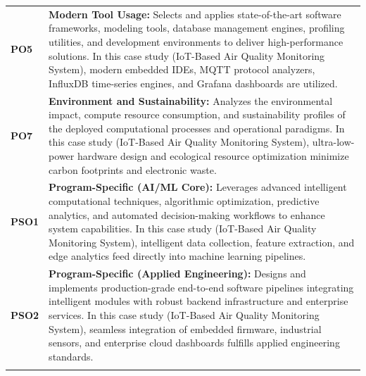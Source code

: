 {\begin{longtable}{@{}>{\centering\arraybackslash}p{1.8cm} p{13.2cm}@{}}
    \addlinespace
\textbf{PO5} & \textbf{Modern Tool Usage:} Selects and applies state-of-the-art software frameworks, modeling tools, database management engines, profiling utilities, and development environments to deliver high-performance solutions. In this case study (IoT-Based Air Quality Monitoring System), modern embedded IDEs, MQTT protocol analyzers, InfluxDB time-series engines, and Grafana dashboards are utilized. \\
    \addlinespace
\textbf{PO7} & \textbf{Environment and Sustainability:} Analyzes the environmental impact, compute resource consumption, and sustainability profiles of the deployed computational processes and operational paradigms. In this case study (IoT-Based Air Quality Monitoring System), ultra-low-power hardware design and ecological resource optimization minimize carbon footprints and electronic waste. \\
    \addlinespace
\textbf{PSO1} & \textbf{Program-Specific (AI/ML Core):} Leverages advanced intelligent computational techniques, algorithmic optimization, predictive analytics, and automated decision-making workflows to enhance system capabilities. In this case study (IoT-Based Air Quality Monitoring System), intelligent data collection, feature extraction, and edge analytics feed directly into machine learning pipelines. \\
    \addlinespace
\textbf{PSO2} & \textbf{Program-Specific (Applied Engineering):} Designs and implements production-grade end-to-end software pipelines integrating intelligent modules with robust backend infrastructure and enterprise services. In this case study (IoT-Based Air Quality Monitoring System), seamless integration of embedded firmware, industrial sensors, and enterprise cloud dashboards fulfills applied engineering standards. \\
    \addlinespace
    \bottomrule
\end{longtable}}